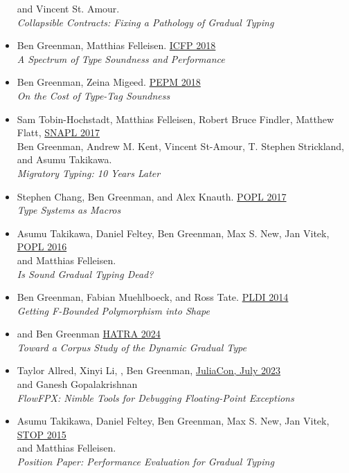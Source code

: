 \documentclass[11pt]{article}
\begin{document}
\begin{itemize}
  and Vincent St. Amour. \\
  \emph{Collapsible Contracts: Fixing a Pathology of Gradual Typing} \hfill {}
\item
  Ben Greenman, Matthias Felleisen. \hfill \href{https://icfp18.sigplan.org/}{ICFP 2018} \\
  \emph{A Spectrum of Type Soundness and Performance} \hfill {}
\item
  Ben Greenman, Zeina Migeed. \hfill \href{https://popl18.sigplan.org/track/PEPM-2018}{PEPM 2018} \\
  \emph{On the Cost of Type-Tag Soundness} \hfill {} %
\item
  Sam Tobin-Hochstadt, Matthias Felleisen, Robert Bruce Findler, Matthew Flatt, \hfill \href{https://snapl.org/2017/}{SNAPL 2017} \\
  Ben Greenman, Andrew M. Kent, Vincent St-Amour, T. Stephen Strickland, \\
  and Asumu Takikawa. \\
  \emph{Migratory Typing: 10 Years Later} \hfill {}
\item
  Stephen Chang, Ben Greenman, and Alex Knauth. \hfill \href{https://popl17.sigplan.org/}{POPL 2017} \\
   \emph{Type Systems as Macros} \hfill {}
\item
  Asumu Takikawa, Daniel Feltey, Ben Greenman, Max S. New, Jan Vitek, \hfill \href{https://popl16.sigplan.org/}{POPL 2016} \\
   and Matthias Felleisen. \\
   \emph{Is Sound Gradual Typing Dead?} \hfill {} %
\item
  Ben Greenman, Fabian Muehlboeck, and Ross Tate. \hfill \href{https://conferences.inf.ed.ac.uk/pldi2014/}{PLDI 2014} \\
  \emph{Getting F-Bounded Polymorphism into Shape} \hfill {}
\end{itemize}

\begin{itemize}
  \item
     and Ben Greenman \hfill \href{https://2024.splashcon.org/home/hatra-2024}{HATRA 2024} \\
      \emph{Toward a Corpus Study of the Dynamic Gradual Type}
  \item
    Taylor Allred, Xinyi Li, , Ben Greenman, \hfill \href{https://juliacon.org/2023/}{JuliaCon, July 2023} \\
     and Ganesh Gopalakrishnan  \\
     \emph{FlowFPX: Nimble Tools for Debugging Floating-Point Exceptions}
  \item
    Asumu Takikawa, Daniel Feltey, Ben Greenman, Max S. New, Jan Vitek, \hfill \href{https://2015.ecoop.org/track/STOP2015}{STOP 2015} \\
     and Matthias Felleisen. \\
     \emph{Position Paper: Performance Evaluation for Gradual Typing}
\end{itemize}
\end{document}
